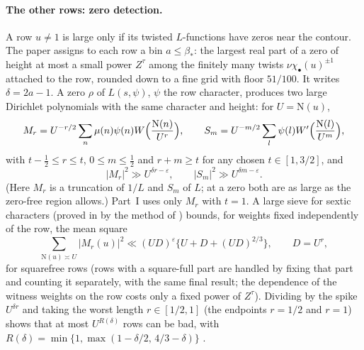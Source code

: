 \documentclass[11pt]{article}
\newcommand{\N}{\mathrm N}
\begin{document}
\paragraph{The other rows: zero detection.} A row $u\ne1$ is large only if
its twisted $L$-functions have zeros near the contour. The paper assigns
to each row a bin $a\le\beta_*$: the largest real part of a zero of height at most a
small power $Z^\tau$ among the finitely many twists $\nu\chi_\bullet(u)^{\pm1}$ attached to
the row, rounded down to a fine grid with floor $51/100$. It writes $\delta=2a-1$. A zero $\rho$ of $L(s,\psi)$, $\psi$ the row character,
produces \cite[Prop.\ prop:detector-witness]{OAI78} two large Dirichlet
polynomials with the same character and height: for $U=\N(u)$,
\begin{equation}\label{eq:witness}
 M_r=U^{-r/2}\sum_n\mu(n)\psi(n)W\Bigl(\frac{\N(n)}{U^r}\Bigr),\qquad
 S_m=U^{-m/2}\sum_l\psi(l)W'\Bigl(\frac{\N(l)}{U^m}\Bigr),
\end{equation}
with $t-\tfrac12\le r\le t$, $0\le m\le\tfrac12$ and $r+m\ge t$ for any chosen
$t\in[1,3/2]$, and
\[
 |M_r|^2\gg U^{\delta r-\varepsilon},\qquad |S_m|^2\gg U^{\delta m-\varepsilon}.
\]
(Here $M_r$ is a truncation of $1/L$ and $S_m$ of $L$; at a zero both are
as large as the zero-free region allows.) Part~I uses only $M_r$ with
$t=1$. A large sieve for sextic characters (proved in \cite[Lemma lem:sextic-large-sieve]{OAI78}
by the method of \cite{BGL}) bounds, for weights fixed independently of the row, the mean square
\[
 \sum_{\N(u)\asymp U}\bigl|M_r(u)\bigr|^2
 \ll(UD)^\varepsilon\bigl\{U+D+(UD)^{2/3}\bigr\},\qquad D=U^r,
\]
for squarefree rows (rows with a square-full part are handled by fixing that part and
counting it separately, with the same final result; the dependence of the witness weights on
the row costs only a fixed power of $Z^\tau$). Dividing by the spike $U^{\delta r}$ and taking
the worst length $r\in[1/2,1]$ (the endpoints $r=1/2$ and $r=1$) shows that at most $U^{R(\delta)}$
rows can be bad, with $R(\delta)=\min\{1,\max(1-\delta/2,\,4/3-\delta)\}$
\cite[Prop.\ prop:sextic-row-count]{OAI78}.
\end{document}
